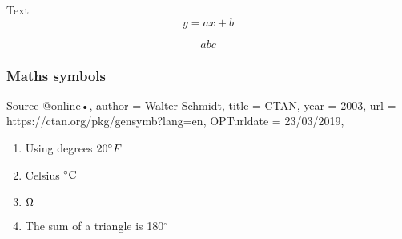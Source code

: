 \documentclass[fleqn]{report}
\begin{document}
\noindent Text %
\begin{equation*} 
	y = ax + b
\end{equation*}

$$ abc $$

\subsubsection{Maths symbols}
Source @online{•,
author = {Wal­ter Sch­midt},
title = {CTAN},
year = {2003},
url = {https://ctan.org/pkg/gensymb?lang=en},
OPTurldate = {23/03/2019},
}


\begin{enumerate}
	\item Using degrees $20 \degree F$
	\item Celsius $ \celsius $
	\item $\ohm$
	\item The sum of a triangle is 180$^{\circ}$
\end{enumerate}
\end{document}
